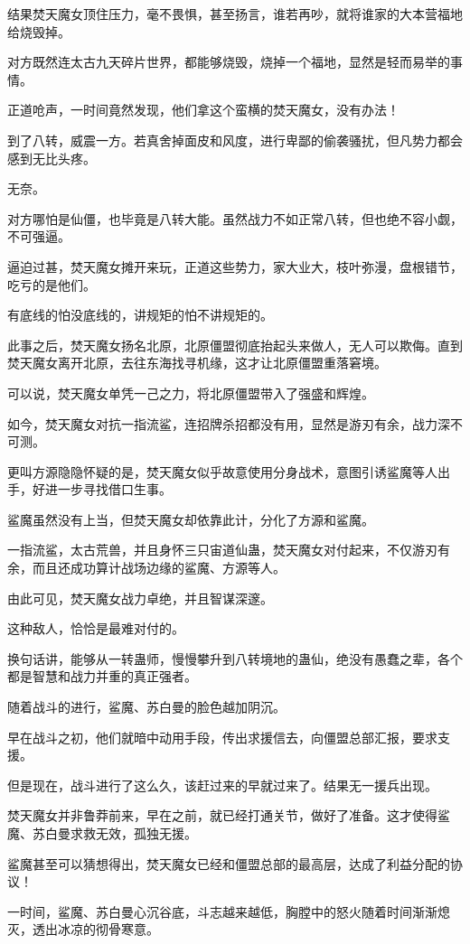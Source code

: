 \begin{this_body}
结果焚天魔女顶住压力，毫不畏惧，甚至扬言，谁若再吵，就将谁家的大本营福地给烧毁掉。

对方既然连太古九天碎片世界，都能够烧毁，烧掉一个福地，显然是轻而易举的事情。

正道呛声，一时间竟然发现，他们拿这个蛮横的焚天魔女，没有办法！

到了八转，威震一方。若真舍掉面皮和风度，进行卑鄙的偷袭骚扰，但凡势力都会感到无比头疼。

无奈。

对方哪怕是仙僵，也毕竟是八转大能。虽然战力不如正常八转，但也绝不容小觑，不可强逼。

逼迫过甚，焚天魔女摊开来玩，正道这些势力，家大业大，枝叶弥漫，盘根错节，吃亏的是他们。

有底线的怕没底线的，讲规矩的怕不讲规矩的。

此事之后，焚天魔女扬名北原，北原僵盟彻底抬起头来做人，无人可以欺侮。直到焚天魔女离开北原，去往东海找寻机缘，这才让北原僵盟重落窘境。

可以说，焚天魔女单凭一己之力，将北原僵盟带入了强盛和辉煌。

如今，焚天魔女对抗一指流鲨，连招牌杀招都没有用，显然是游刃有余，战力深不可测。

更叫方源隐隐怀疑的是，焚天魔女似乎故意使用分身战术，意图引诱鲨魔等人出手，好进一步寻找借口生事。

鲨魔虽然没有上当，但焚天魔女却依靠此计，分化了方源和鲨魔。

一指流鲨，太古荒兽，并且身怀三只宙道仙蛊，焚天魔女对付起来，不仅游刃有余，而且还成功算计战场边缘的鲨魔、方源等人。

由此可见，焚天魔女战力卓绝，并且智谋深邃。

这种敌人，恰恰是最难对付的。

换句话讲，能够从一转蛊师，慢慢攀升到八转境地的蛊仙，绝没有愚蠢之辈，各个都是智慧和战力并重的真正强者。

随着战斗的进行，鲨魔、苏白曼的脸色越加阴沉。

早在战斗之初，他们就暗中动用手段，传出求援信去，向僵盟总部汇报，要求支援。

但是现在，战斗进行了这么久，该赶过来的早就过来了。结果无一援兵出现。

焚天魔女并非鲁莽前来，早在之前，就已经打通关节，做好了准备。这才使得鲨魔、苏白曼求救无效，孤独无援。

鲨魔甚至可以猜想得出，焚天魔女已经和僵盟总部的最高层，达成了利益分配的协议！

一时间，鲨魔、苏白曼心沉谷底，斗志越来越低，胸膛中的怒火随着时间渐渐熄灭，透出冰凉的彻骨寒意。


\end{this_body}

